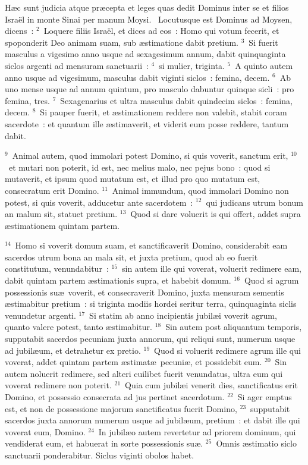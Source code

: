  H\ae c sunt judicia atque pr\ae cepta et leges quas dedit Dominus inter se et filios Isra\"el in monte Sinai per manum Moysi.
~Locutusque est Dominus ad Moysen, dicens~:
${}^{2}$~Loquere filiis Isra\"el, et dices ad eos~: Homo qui votum fecerit, et spoponderit Deo animam suam, sub \ae stimatione dabit pretium.
${}^{3}$~Si fuerit masculus a vigesimo anno usque ad sexagesimum annum, dabit quinquaginta siclos argenti ad mensuram sanctuarii~:
${}^{4}$~si mulier, triginta.
${}^{5}$~A quinto autem anno usque ad vigesimum, masculus dabit viginti siclos~: femina, decem.
${}^{6}$~Ab uno mense usque ad annum quintum, pro masculo dabuntur quinque sicli~: pro femina, tres.
${}^{7}$~Sexagenarius et ultra masculus dabit quindecim siclos~: femina, decem.
${}^{8}$~Si pauper fuerit, et \ae stimationem reddere non valebit, stabit coram sacerdote~: et quantum ille \ae stimaverit, et viderit eum posse reddere, tantum dabit.


${}^{9}$~Animal autem, quod immolari potest Domino, si quis voverit, sanctum erit,
${}^{10}$~et mutari non poterit, id est, nec melius malo, nec pejus bono~: quod si mutaverit, et ipsum quod mutatum est, et illud pro quo mutatum est, consecratum erit Domino.
${}^{11}$~Animal immundum, quod immolari Domino non potest, si quis voverit, adducetur ante sacerdotem~:
${}^{12}$~qui judicans utrum bonum an malum sit, statuet pretium.
${}^{13}$~Quod si dare voluerit is qui offert, addet supra \ae stimationem quintam partem.


${}^{14}$~Homo si voverit domum suam, et sanctificaverit Domino, considerabit eam sacerdos utrum bona an mala sit, et juxta pretium, quod ab eo fuerit constitutum, venundabitur~:
${}^{15}$~sin autem ille qui voverat, voluerit redimere eam, dabit quintam partem \ae stimationis supra, et habebit domum.
${}^{16}$~Quod si agrum possessionis su\ae\ voverit, et consecraverit Domino, juxta mensuram sementis \ae stimabitur pretium~: si triginta modiis hordei seritur terra, quinquaginta siclis venundetur argenti.
${}^{17}$~Si statim ab anno incipientis jubil\ae i voverit agrum, quanto valere potest, tanto \ae stimabitur.
${}^{18}$~Sin autem post aliquantum temporis, supputabit sacerdos pecuniam juxta annorum, qui reliqui sunt, numerum usque ad jubil\ae um, et detrahetur ex pretio.
${}^{19}$~Quod si voluerit redimere agrum ille qui voverat, addet quintam partem \ae stimat\ae\ pecuni\ae , et possidebit eum.
${}^{20}$~Sin autem noluerit redimere, sed alteri cuilibet fuerit venundatus, ultra eum qui voverat redimere non poterit.
${}^{21}$~Quia cum jubil\ae i venerit dies, sanctificatus erit Domino, et possessio consecrata ad jus pertinet sacerdotum.
${}^{22}$~Si ager emptus est, et non de possessione majorum sanctificatus fuerit Domino,
${}^{23}$~supputabit sacerdos juxta annorum numerum usque ad jubil\ae um, pretium~: et dabit ille qui voverat eum, Domino.
${}^{24}$~In jubil\ae o autem revertetur ad priorem dominum, qui vendiderat eum, et habuerat in sorte possessionis su\ae .
${}^{25}$~Omnis \ae stimatio siclo sanctuarii ponderabitur. Siclus viginti obolos habet.


